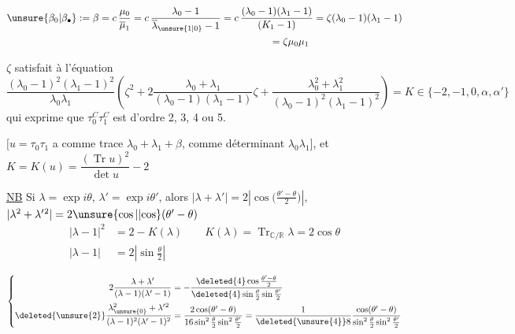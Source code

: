 \[
\begin{aligned}
\unsure{\beta_0|\beta_{\bullet}}:=\beta&=c\,\frac{\mu_0}{\overline{\mu}_1}
=c\,\frac{\lambda_0-1}{\overline{\lambda}_{\unsure{1|0}}-1}
=c\,\frac{(\lambda_0-1)(\lambda_1-1)}{(K_1-1)}
=\zeta(\lambda_0-1)(\lambda_1-1)\\
&\hspace{6cm}=\zeta\mu_0\mu_1
\end{aligned}
\]

$\zeta$ satisfait à l'équation
\[
\frac{(\lambda_0-1)^2(\lambda_1-1)^2}{\lambda_0\lambda_1}
\left(\zeta^2+2\frac{\lambda_0+\lambda_1}{(\lambda_0-1)(\lambda_1-1)}\zeta
+\frac{\lambda_0^2+\lambda_1^2}{(\lambda_0-1)^2(\lambda_1-1)^2}\right)
=K\in\{-2,-1,0,\alpha,\alpha'\}
\]
qui exprime que $\tau_0^{C}\tau_1^C$ est d'ordre 2, 3, 4 ou 5.

$[u=\tau_0\tau_1$ a comme trace $\lambda_0+\lambda_1+\beta$, comme déterminant $\lambda_0\lambda_1]$, et $K=K(u)=\dfrac{(\operatorname{Tr}u)^2}{\det u}-2$

\uline{NB} Si $\lambda=\exp i\theta$, $\lambda'=\exp i\theta'$, alors $\lvert\lambda+\lambda'\rvert=2\left|\cos\bigl(\frac{\theta'-\theta}{2}\bigr)\right|$, $\lvert\lambda^2+\lambda'{}^2\rvert=2\unsure{\cos|\lvert\cos}(\theta'-\theta)$
\[
\begin{aligned}
|\lambda-1|^2&=2-K(\lambda)\qquad K(\lambda)=\operatorname{Tr}_{\mathbb C/\mathbb R}\lambda=2\cos\theta\\
|\lambda-1|&=2\left|\sin\frac{\theta}{2}\right|
\end{aligned}
\]

\[
\left\{\begin{aligned}
2\frac{\lambda+\lambda'}{(\lambda-1)(\lambda'-1)}
&=-\frac{\deleted{4}\cos\frac{\theta'-\theta}{2}}{\deleted{4}\sin\frac\theta2\sin\frac{\theta'}2}\\
\deleted{\unsure{2}}\frac{\lambda_{\unsure{0}}^2+\lambda'{}^2}{(\lambda-1)^2(\lambda'-1)^2}
&=\frac{2\cos(\theta'-\theta)}{16\sin^2\frac\theta2\sin^2\frac{\theta'}2}
=\frac{1}{\deleted{\unsure{4}}8}\frac{\cos(\theta'-\theta)}{\sin^2\frac\theta2\sin^2\frac{\theta'}2}
\end{aligned}\right.
\]


